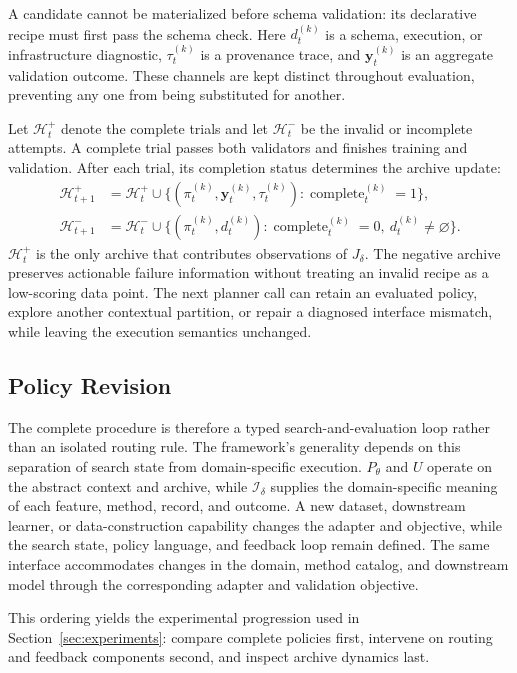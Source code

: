 

A candidate cannot be materialized before schema validation: its declarative recipe must first pass the schema check.
Here $d_t^{(k)}$ is a schema, execution, or infrastructure diagnostic, $\tau_t^{(k)}$ is a provenance trace, and $\mathbf{y}_t^{(k)}$ is an aggregate validation outcome.
These channels are kept distinct throughout evaluation, preventing any one from being substituted for another.


Let $\mathcal{H}^{+}_t$ denote the complete trials and let $\mathcal{H}^{-}_t$ be the invalid or incomplete attempts.
A complete trial passes both validators and finishes training and validation.
After each trial, its completion status determines the archive update:
\begin{equation}
\begin{aligned}
 \mathcal{H}^{+}_{t+1}
 &=\mathcal{H}^{+}_{t}\cup
 \{(\pi_t^{(k)},\mathbf{y}_t^{(k)},\tau_t^{(k)}):
       \operatorname{complete}_t^{(k)}=1\},\\
 \mathcal{H}^{-}_{t+1}
 &=\mathcal{H}^{-}_{t}\cup
 \{(\pi_t^{(k)},d_t^{(k)}):
       \operatorname{complete}_t^{(k)}=0,\ d_t^{(k)}\neq\varnothing\}.
\end{aligned}
\label{eq:archive_rule}
\end{equation}
$\mathcal{H}^{+}_t$ is the only archive that contributes observations of $J_{\delta}$.
The negative archive preserves actionable failure information without treating an invalid recipe as a low-scoring data point.
The next planner call can retain an evaluated policy, explore another contextual partition, or repair a diagnosed interface mismatch, while leaving the execution semantics unchanged.

\subsection{Policy Revision}

The complete procedure is therefore a typed search-and-evaluation loop rather than an isolated routing rule. The framework's generality depends on this separation of search state from domain-specific execution.
$P_{\theta}$ and $U$ operate on the abstract context and archive, while $\mathcal{I}_{\delta}$ supplies the domain-specific meaning of each feature, method, record, and outcome.
A new dataset, downstream learner, or data-construction capability changes the adapter and objective, while the search state, policy language, and feedback loop remain defined.
The same interface accommodates changes in the domain, method catalog, and downstream model through the corresponding adapter and validation objective.

This ordering yields the experimental progression used in Section~\ref{sec:experiments}: compare complete policies first, intervene on routing and feedback components second, and inspect archive dynamics last.

